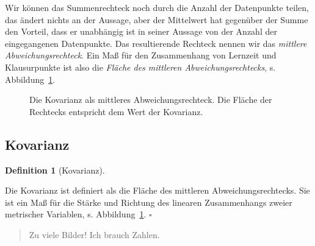 \documentclass[
  letterpaper,
  twoside,
  open=any]{scrbook}
\theoremstyle{definition}
\theoremstyle{definition}
\theoremstyle{definition}
\newtheorem{definition}{Definition}[chapter]
\theoremstyle{remark}
\begin{document}
Wir können das Summenrechteck noch durch die Anzahl der Datenpunkte
teilen, das ändert nichts an der Aussage, aber der Mittelwert hat
gegenüber der Summe den Vorteil, dass er unabhängig ist in seiner
Aussage von der Anzahl der eingegangenen Datenpunkte. Das resultierende
Rechteck nennen wir das \emph{mittlere Abweichungsrechteck}. Ein Maß für
den Zusammenhang von Lernzeit und Klausurpunkte ist also die
\emph{Fläche des mittleren Abweichungsrechtecks}, s.
Abbildung~\ref{fig-cov2}.

\begin{figure}


\caption{\label{fig-cov2}Die Kovarianz als mittleres
Abweichungsrechteck. Die Fläche der Rechtecks entspricht dem Wert der
Kovarianz.}

\end{figure}%

\subsection{Kovarianz}\label{sec-kov}

\begin{definition}[Kovarianz]\protect\hypertarget{def-kov}{}\label{def-kov}

Die Kovarianz ist definiert als die Fläche des mittleren
Abweichungsrechtecks. Sie ist ein Maß für die Stärke und Richtung des
linearen Zusammenhangs zweier metrischer Variablen, s.
Abbildung~\ref{fig-cov2}. \(\square\)

\end{definition}

\begin{quote}
{} Zu viele Bilder! Ich brauch Zahlen.
\end{quote}
\end{document}

